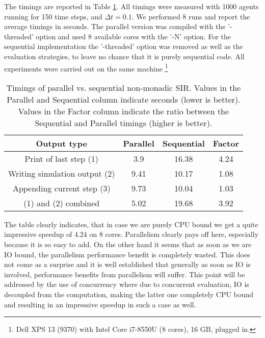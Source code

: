 The timings are reported in Table \ref{tab:parallel_nonmonadic_sir_timings}. All timings were measured with 1000 agents running for 150 time steps, and $\Delta t = 0.1$. We performed 8 runs and report the average timings in seconds. The parallel version was compiled with the '-threaded' option and used 8 available cores with the '-N' option. For the sequential implementation the '-threaded' option was removed as well as the evaluation strategies, to leave no chance that it is purely sequential code. All experiments were carried out on the same machine \footnote{Dell XPS 13 (9370) with Intel Core i7-8550U (8 cores), 16 GB, plugged in.}

\begin{table}
	\centering
	\begin{tabular}{ c || c | c | c }
		Output type                   & Parallel & Sequential & Factor \\ \hline
		Print of last step (1)        & 3.9      & 16.38      & 4.24 \\ \hline
		Writing simulation output (2) & 9.41     & 10.17      & 1.08 \\ \hline
		Appending current step (3)    & 9.73     & 10.04      & 1.03 \\ \hline
		(1) and (2) combined	          & 5.02     & 19.68      & 3.92 \\ \hline
	\end{tabular}
	
	\caption{Timings of parallel vs. sequential non-monadic SIR. Values in the Parallel and Sequential column indicate seconds (lower is better). Values in the Factor column indicate the ratio between the Sequential and Parallel timings (higher is better).}
	\label{tab:parallel_nonmonadic_sir_timings}
\end{table}

The table clearly indicates, that in case we are purely CPU bound we get a quite impressive speedup of 4.24 on 8 cores. Parallelism clearly pays off here, especially because it is so easy to add. On the other hand it seems that as soon as we are IO bound, the parallelism performance benefit is completely wasted. This does not come as a surprise and it is well established that generally as soon as IO is involved, performance benefits from parallelism will suffer. This point will be addressed by the use of concurrency where due to concurrent evaluation, IO is decoupled from the computation, making the latter one completely CPU bound and resulting in an impressive speedup in such a case as well.

